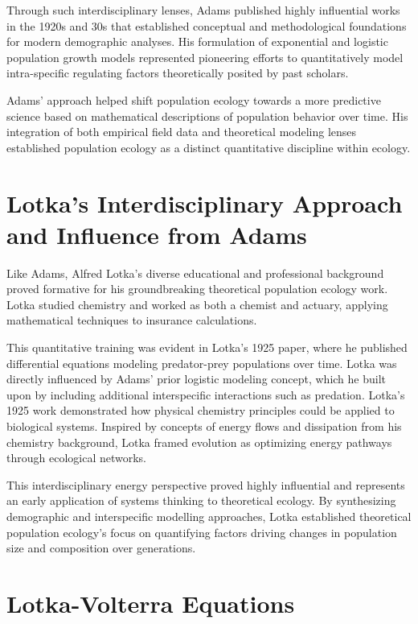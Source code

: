 Through such interdisciplinary lenses, Adams published highly influential works in the 1920s and 30s that established conceptual and methodological foundations for modern demographic analyses. His formulation of exponential and logistic population growth models represented pioneering efforts to quantitatively model intra-specific regulating factors theoretically posited by past scholars.

Adams' approach helped shift population ecology towards a more predictive science based on mathematical descriptions of population behavior over time. His integration of both empirical field data and theoretical modeling lenses established population ecology as a distinct quantitative discipline within ecology.

\section{Lotka's Interdisciplinary Approach and Influence from Adams}

Like Adams, Alfred Lotka's diverse educational and professional background proved formative for his groundbreaking theoretical population ecology work. Lotka studied chemistry and worked as both a chemist and actuary, applying mathematical techniques to insurance calculations.

This quantitative training was evident in Lotka's 1925 paper, where he published differential equations modeling predator-prey populations over time. Lotka was directly influenced by Adams' prior logistic modeling concept, which he built upon by including additional interspecific interactions such as predation. Lotka's 1925 work demonstrated how physical chemistry principles could be applied to biological systems. Inspired by concepts of energy flows and dissipation from his chemistry background, Lotka framed evolution as optimizing energy pathways through ecological networks.

This interdisciplinary energy perspective proved highly influential and represents an early application of systems thinking to theoretical ecology. By synthesizing demographic and interspecific modelling approaches, Lotka established theoretical population ecology's focus on quantifying factors driving changes in population size and composition over generations.

\section{Lotka-Volterra Equations}

